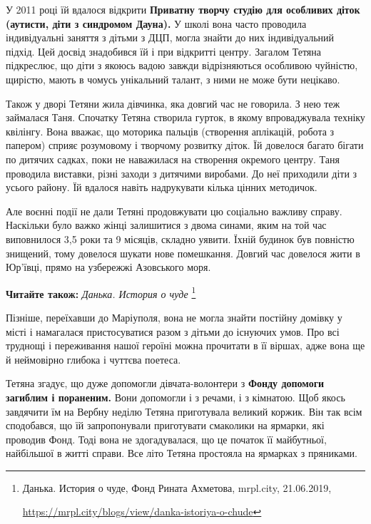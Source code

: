 У 2011 році їй вдалося відкрити \textbf{Приватну творчу студію для особливих діток
(аутисти, діти з синдромом Дауна).} У школі вона часто проводила індивідуальні
заняття з дітьми з ДЦП, могла знайти до них індивідуальний підхід. Цей досвід
знадобився їй і при відкритті центру. Загалом Тетяна підкреслює, що діти з
якоюсь вадою завжди відрізняються особливою чуйністю, щирістю, мають в чомусь
унікальний талант, з ними не може бути нецікаво.

Також у дворі Тетяни жила дівчинка, яка довгий час не говорила. З нею теж
займалася Таня. Спочатку Тетяна створила гурток, в якому впроваджувала техніку
квілінгу. Вона вважає, що моторика пальців (створення аплікацій, робота з
папером) сприяє розумовому і творчому розвитку діток. Їй довелося багато бігати
по дитячих садках, поки не наважилася на створення окремого центру. Таня
проводила виставки, різні заходи з дитячими виробами. До неї приходили діти з
усього району. Їй вдалося навіть надрукувати кілька цінних методичок.

Але воєнні події не дали Тетяні продовжувати цю соціально важливу справу.
Наскільки було важко жінці залишитися з двома синами, яким на той час
виповнилося 3,5 роки та 9 місяців, складно уявити. Їхній будинок був повністю
знищений, тому довелося шукати нове помешкання. Довгий час довелося жити в
Юр'ївці, прямо на узбережжі Азовського моря.

\textbf{Читайте також:} \emph{Данька. История о чуде}%
\footnote{Данька. История о чуде, Фонд Рината Ахметова, mrpl.city, 21.06.2019, \par%
\url{https://mrpl.city/blogs/view/danka-istoriya-o-chude}
}

Пізніше, переїхавши до Маріуполя, вона не могла знайти постійну домівку у місті
і намагалася пристосуватися разом з дітьми до існуючих умов. Про всі труднощі і
переживання нашої героїні можна прочитати в її віршах, адже вона ще й
неймовірно глибока і чуттєва поетеса.

Тетяна згадує, що дуже допомогли дівчата-волонтери з \textbf{Фонду допомоги загиблим і
пораненим.} Вони допомогли і з речами, і з кімнатою. Щоб якось завдячити їм на
Вербну неділю Тетяна приготувала великий коржик. Він так всім сподобався, що їй
запропонували приготувати смаколики на ярмарки, які проводив Фонд. Тоді вона не
здогадувалася, що це початок її майбутньої, найбільшої в житті справи. Все літо
Тетяна простояла на ярмарках з пряниками.



